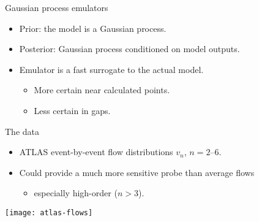\documentclass{beamer}
\begin{document}
\begin{frame}{Gaussian process emulators}

  \begin{itemize}
    \item Prior:  the model is a Gaussian process.
    \item Posterior:  Gaussian process conditioned on model outputs.
  \end{itemize}


  

  \begin{itemize}
    \item Emulator is a fast surrogate to the actual model.
      \begin{itemize}
        \item More certain near calculated points.
        \item Less certain in gaps.
      \end{itemize}
  \end{itemize}
\end{frame}





\begin{frame}{The data}
  \begin{itemize}
    \item ATLAS event-by-event flow distributions $v_n$, $n = 2$--6.
    \item Could provide a much more sensitive probe than average flows
      \begin{itemize}
        \item especially high-order ($n > 3$).
      \end{itemize}
  \end{itemize}

  \mds

  \centering
  \texttt{[image: atlas-flows]}
\end{frame}
\end{document}
